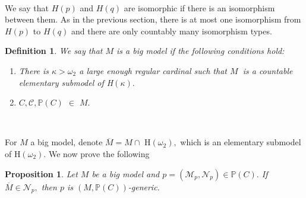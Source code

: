 \documentclass{article}
\newtheorem{definition}[theorem]{Definition}
\newtheorem{proposition}[theorem]{Proposition}
\begin{document}
\qquad\qquad\qquad\qquad\qquad\ \ \ \ 

We say that $H\left(  p\right)  $ and $H\left(  q\right)  $ are isomorphic if
there is an isomorphism between them. As in the previous section, there is at
most one isomorphism from $H\left(  p\right)  $ to $H\left(  q\right)  $ and
there are only countably many isomorphism types.

\begin{definition}
We say that $M$ is a \emph{big model} if the following conditions hold:

\begin{enumerate}
\item There is $\kappa>\omega_{2}$ a large enough regular cardinal such that
$M$ $\ $is a countable elementary submodel of \textsf{H}$\left(
\kappa\right)  .$

\item $C,\mathcal{C},\mathbb{P}\left(  C\right)  $ $\mathbb{\in}$ $M.$
\end{enumerate}
\end{definition}

\qquad\ \qquad\ \ \qquad\ \ \ 

For $M$ a big model, denote $\overline{M}=M\cap$ \textsf{H}$\left(  \omega
_{2}\right)  ,$ which is an elementary submodel of \textsf{H}$\left(
\omega_{2}\right)  .$ We now prove the following

\begin{proposition}
Let $M$ be a big model and $p=(\mathcal{M}_{p},\mathcal{N}_{p})\in
\mathbb{P}\left(  C\right)  .$ If $\overline{M}\in\mathcal{N}_{p},$ then $p$
is $(M,\mathbb{P}\left(  C\right)  )$-generic.
\end{proposition}
\end{document}
